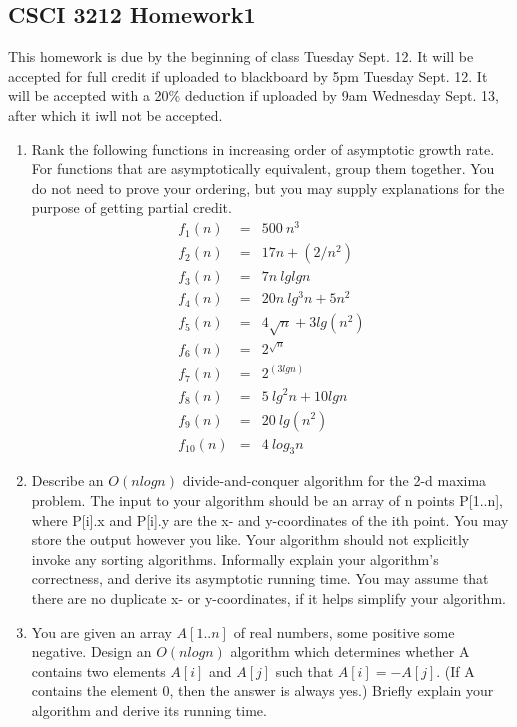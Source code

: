 \documentclass{article}
\begin{document}
\subsection*{CSCI 3212 Homework1}
This homework is due by the beginning of class Tuesday Sept. 12.  It will be accepted for full credit if uploaded to blackboard by 5pm Tuesday Sept. 12.  It will be accepted with a 20\% deduction if uploaded by 9am Wednesday Sept. 13, after which it iwll not be accepted.
\begin{enumerate}
\item Rank the following functions in increasing order of asymptotic growth rate. For
functions that are asymptotically equivalent, group them together. You do not need to prove
your ordering, but you may supply explanations for the purpose of getting partial credit.
\begin{eqnarray*}
f_1(n) &=& 500~n^3\\
f_2(n) &=& 17n + (2/n^2)\\
f_3(n) &=& 7n~lg lg n\\
f_4(n) &=& 20n~lg^3 n + 5n^2\\
f_5(n) &=& 4\sqrt{n} + 3 lg(n^2)\\
f_6(n) &=& 2^{\sqrt{n}}\\
f_7(n) &=& 2^(3 lg n)\\
f_8(n) &=& 5~lg^2 n + 10 lg n\\
f_9(n) &=& 20~lg(n^2)\\
f_{10}(n) &=& 4~log_3 n
\end{eqnarray*}


\item Describe an $O(n log n)$ divide-and-conquer algorithm for the 2-d maxima problem.
The input to your algorithm should be an array of n points P[1..n], where P[i].x and P[i].y
are the x- and y-coordinates of the ith point. You may store the output however you like.
Your algorithm should not explicitly invoke any sorting algorithms. Informally explain your
algorithm’s correctness, and derive its asymptotic running time. You may assume that there
are no duplicate x- or y-coordinates, if it helps simplify your algorithm.

\item You are given an array $A[1..n]$ of real numbers, some positive some negative. Design
an $O(n log n)$ algorithm which determines whether A contains two elements $A[i]$ and $A[j]$
such that $A[i] = −A[j]$. (If A contains the element 0, then the answer is always yes.) Briefly explain your algorithm and derive its running time.
\end{enumerate}
\end{document}
